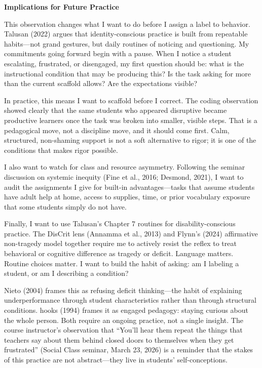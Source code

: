 \documentclass[12pt]{article}
\newcommand{\apaheading}[1]{\begin{center}\textbf{#1}\end{center}}
\begin{document}
\apaheading{Implications for Future Practice}

This observation changes what I want to do before I assign a label to behavior. Talusan (2022) argues that identity-conscious practice is built from repeatable habits---not grand gestures, but daily routines of noticing and questioning. My commitments going forward begin with a pause. When I notice a student escalating, frustrated, or disengaged, my first question should be: what is the instructional condition that may be producing this? Is the task asking for more than the current scaffold allows? Are the expectations visible?

In practice, this means I want to scaffold before I correct. The coding observation showed clearly that the same students who appeared disruptive became productive learners once the task was broken into smaller, visible steps. That is a pedagogical move, not a discipline move, and it should come first. Calm, structured, non-shaming support is not a soft alternative to rigor; it is one of the conditions that makes rigor possible.

I also want to watch for class and resource asymmetry. Following the seminar discussion on systemic inequity (Fine et al., 2016; Desmond, 2021), I want to audit the assignments I give for built-in advantages---tasks that assume students have adult help at home, access to supplies, time, or prior vocabulary exposure that some students simply do not have.

Finally, I want to use Talusan's Chapter 7 routines for disability-conscious practice. The DisCrit lens (Annamma et al., 2013) and Flynn's (2024) affirmative non-tragedy model together require me to actively resist the reflex to treat behavioral or cognitive difference as tragedy or deficit. Language matters. Routine choices matter. I want to build the habit of asking: am I labeling a student, or am I describing a condition?

Nieto (2004) frames this as refusing deficit thinking---the habit of explaining underperformance through student characteristics rather than through structural conditions. hooks (1994) frames it as engaged pedagogy: staying curious about the whole person. Both require an ongoing practice, not a single insight. The course instructor's observation that ``You'll hear them repeat the things that teachers say about them behind closed doors to themselves when they get frustrated'' (Social Class seminar, March 23, 2026) is a reminder that the stakes of this practice are not abstract---they live in students' self-conceptions.
\end{document}

